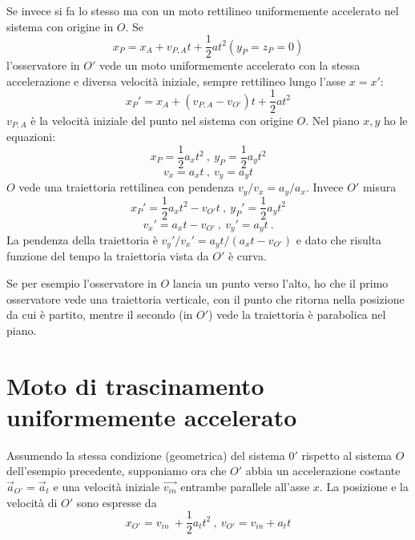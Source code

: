 \documentclass[class=book, crop=false, oneside, 12pt]{standalone}
\begin{document}
Se invece si fa lo stesso ma con un moto rettilineo uniformemente accelerato nel sistema con origine in \(O\). \newline
Se
\begin{equation*}
    x_P = x_A + v_{P,A} t + \frac{1}{2} a t^2  (y_P = z_P = 0 )
\end{equation*}
l'osservatore in \(O'\) vede un moto uniformemente accelerato con la stessa accelerazione e diversa velocità iniziale, sempre rettilineo lungo l'asse \(x = x'\): 
\begin{equation*}
    x_P' = x_A + (v_{P,A}-v_{O'}) t + \frac{1}{2} a t^2
\end{equation*}
\(v_{P,A}\) è la velocità iniziale del punto nel sistema con origine \(O\).
Nel piano \(x,y\) ho le equazioni:
\begin{equation*}
    x_P = \frac{1}{2} a_x t^2 \ , \ y_P = \frac{1}{2} a_y t^2
\end{equation*}
\begin{equation*}
    v_x = a_x t \ , \ v_y = a_y t
\end{equation*}
\(O\) vede una traiettoria rettilinea con pendenza \(v_y / v_x = a_y / a_x\). 
Invece \(O'\) misura
\begin{equation*}
    x_P' = \frac{1}{2} a_x t^2 - v_{O'} t \ , \ y_P ' = \frac{1}{2} a_y t^2
\end{equation*}
\begin{equation*}
    v_x ' = a_x t - v_{O'} \ , \ v_y ' = a_y t  \ .
\end{equation*}
La pendenza della traiettoria è \(v_y' / v_x' = a_y t / (a_x t - v_{O'})\) e dato che risulta funzione del tempo la traiettoria vista da \(O'\) è curva.

Se per esempio l'osservatore in \(O\) lancia un punto verso l'alto, ho che il primo osservatore vede una traiettoria verticale, con il punto che ritorna nella posizione da cui è partito, mentre il secondo (in \(O'\)) vede la traiettoria è parabolica nel piano.

\section{Moto di trascinamento uniformemente accelerato}

Assumendo la stessa condizione (geometrica) del sistema \(0'\) rispetto al sistema \(O\) dell'esempio precedente, 
supponiamo ora che \(O'\) abbia un accelerazione costante \(\overrightarrow{a}_{O'} = \overrightarrow{a}_t\) e una velocità iniziale \(\overrightarrow{v_{in}}\) entrambe parallele all'asse \(x\).\newline
La posizione e la velocità di \(O'\) sono espresse da
\begin{equation*}
    x_{O'} =v_{in} \ + \frac{1}{2} a_t t^2 \ , \ v_{O'} = v_{in} + a_t t
\end{equation*}
\end{document}
